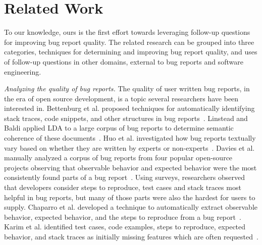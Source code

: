 \section{Related Work}
To our knowledge, ours is the first effort towards leveraging follow-up questions for improving bug report quality. The related research can be grouped into three categories, techniques for determining and improving bug report quality, and uses of follow-up questions in other domains, external to bug reports and software engineering.

\noindent
{\em Analyzing the quality of bug reports.} The quality of user written bug reports, in the era of open source development, is a topic several researchers have been interested in. Bettenburg et al. proposed techniques for automatically identifying stack traces, code snippets, and other structures in bug reports~\cite{bettenburg08extracting}. Linstead and Baldi applied LDA to a large corpus of bug reports to determine semantic coherence of these documents~\cite{linstead09mining}. Huo et al. investigated how bug reports textually vary based on whether they are written by experts or non-experts~\cite{Huo2014AnES}. Davies et al. manually analyzed a corpus of bug reports from four popular open-source projects observing that observable behavior and expected behavior were the most consistently found parts of a bug report~\cite{davies14whats}. Using surveys, researchers observed that developers consider steps to reproduce, test cases and stack traces most helpful in bug reports, but many of those parts were also the hardest for users to supply. Chaparro et al. developed a technique to automatically extract observable behavior, expected behavior, and the steps to reproduce from a bug report~\cite{chaparro17detecting}. Karim et al. identified test cases, code examples, steps to reproduce, expected behavior, and stack traces as initially missing features which are often requested~\cite{Karim2017UnderstandingKF, karim2019identifying}.

